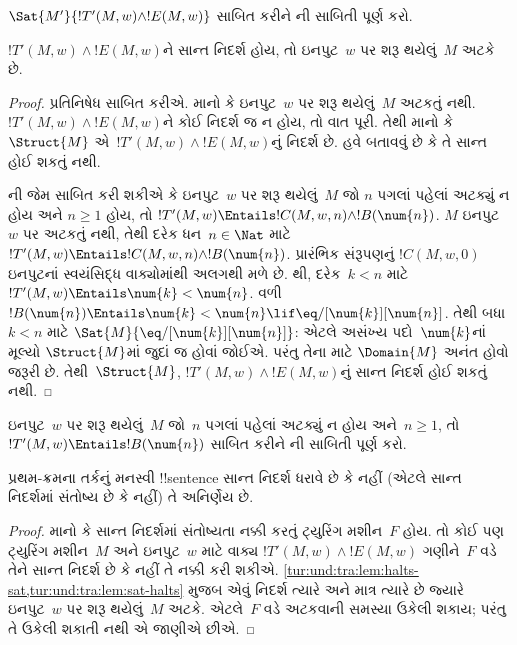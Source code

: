 \documentclass[../../../include/open-logic-section]{subfiles}
\begin{document}
\begin{prob}
  $\Sat{M'}{!T'(M,w) \land !E(M,w)}$
  સાબિત કરીને ની
  સાબિતી પૂર્ણ કરો.
\end{prob}

\begin{lem}
  $!T'(M,w) \land !E(M,w)$ને સાન્ત નિદર્શ
  હોય, તો ઇનપુટ~$w$ પર શરૂ થયેલું~$M$ અટકે છે.
\end{lem}

\begin{proof}
  પ્રતિનિષેધ સાબિત કરીએ. માનો કે ઇનપુટ~$w$
  પર શરૂ થયેલું~$M$ અટકતું નથી.
  $!T'(M,w) \land !E(M,w)$ને કોઈ નિદર્શ
  જ ન હોય, તો વાત પૂરી. તેથી માનો કે
  $\Struct{M}$ એ~$!T'(M,w) \land !E(M, w)$નું
  નિદર્શ છે. હવે બતાવવું છે કે તે સાન્ત હોઈ
  શકતું નથી.

  ની જેમ સાબિત કરી
  શકીએ કે ઇનપુટ~$w$ પર શરૂ થયેલું~$M$ જો
  $n$ પગલાં પહેલાં અટક્યું ન હોય અને
  $n \ge 1$ હોય, તો $!T'(M,w) \Entails
  !C(M, w, n) \land !B(\num{n})$.
  $M$ ઇનપુટ~$w$ પર અટકતું નથી, તેથી
  દરેક ધન~$n \in \Nat$ માટે
  $!T'(M,w) \Entails !C(M, w, n) \land
  !B(\num{n})$. પ્રારંભિક સંરૂપણનું
  $!C(M,w,0)$ ઇનપુટનાં સ્વયંસિદ્ધ વાક્યોમાંથી
  અલગથી મળે છે.
  થી, દરેક~$k < n$
  માટે $!T'(M,w) \Entails \num{k} < \num{n}$.
  વળી $!B(\num{n}) \Entails
  \num{k} < \num{n} \lif
  \eq/[\num{k}][\num{n}]$. તેથી બધા
  $k < n$ માટે
  $\Sat{M}{\eq/[\num{k}][\num{n}]}$:
  એટલે અસંખ્ય પદો~$\num{k}$નાં મૂલ્યો
  $\Struct{M}$માં જુદાં જ હોવાં જોઈએ.
  પરંતુ તેના માટે $\Domain{M}$ અનંત હોવો
  જરૂરી છે. તેથી~$\Struct{M}$,
  $!T'(M,w) \land !E(M, w)$નું સાન્ત નિદર્શ
  હોઈ શકતું નથી.
\end{proof}

\begin{prob}
  ઇનપુટ~$w$ પર શરૂ થયેલું~$M$ જો~$n$
  પગલાં પહેલાં અટક્યું ન હોય અને~$n \ge 1$,
  તો $!T'(M,w) \Entails !B(\num{n})$
  સાબિત કરીને
  ની સાબિતી
  પૂર્ણ કરો.
\end{prob}

\begin{thm}[ટ્રાખ્ટેનબ્રોટનું પ્રમેય]
  પ્રથમ-ક્રમના તર્કનું મનસ્વી !!{sentence} સાન્ત
  નિદર્શ ધરાવે છે કે નહીં (એટલે સાન્ત
  નિદર્શમાં સંતોષ્ય છે કે નહીં) તે અનિર્ણેય છે.
\end{thm}

\begin{proof}
  માનો કે સાન્ત નિદર્શમાં સંતોષ્યતા નક્કી કરતું
  ટ્યુરિંગ મશીન~$F$ હોય. તો કોઈ પણ ટ્યુરિંગ
  મશીન~$M$ અને ઇનપુટ~$w$ માટે વાક્ય
  $!T'(M,w) \land !E(M,w)$ ગણીને~$F$ વડે
  તેને સાન્ત નિદર્શ છે કે નહીં તે નક્કી કરી
  શકીએ. \cref{tur:und:tra:lem:halts-sat,tur:und:tra:lem:sat-halts}
  મુજબ એવું નિદર્શ ત્યારે અને માત્ર ત્યારે છે
  જ્યારે ઇનપુટ~$w$ પર શરૂ થયેલું~$M$ અટકે.
  એટલે~$F$ વડે અટકવાની સમસ્યા ઉકેલી શકાય;
  પરંતુ તે ઉકેલી શકાતી નથી એ જાણીએ છીએ.
\end{proof}
\end{document}

